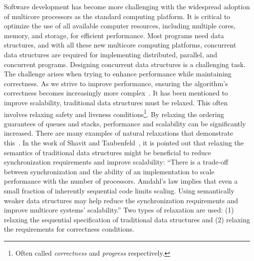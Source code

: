 Software development has become more challenging with the widespread adoption of multicore processors as the standard computing platform. It is critical to optimize the use of all available computer resources, including multiple cores, memory, and storage, for efficient performance. Most programs need data structures, and with all these new multicore computing platforms, concurrent data structures are required for implementing distributed, parallel, and concurrent programs. Designing concurrent data structures is a challenging task. The challenge arises when trying to enhance performance while maintaining correctness. As we strive to improve performance, ensuring the algorithm's correctness becomes increasingly more complex~\cite{DBLP_journals_cacm_Shavit11}. It has been mentioned to improve scalability, traditional data structures must be relaxed. This often involves relaxing safety and liveness conditions\footnote{Often called \textit{correctness} and \textit{progress} respectively.}. By relaxing the ordering guarantees of queues and stacks, performance and scalability can be significantly increased. There are many examples of natural relaxations that demonstrate this~\cite{DBLP_journals_cacm_Shavit11}. In the work of Shavit and Taubenfeld~\cite{DBLP_journals_dc_ShavitT16}, it is pointed out that relaxing the semantics of traditional data structures might be beneficial to reduce synchronization requirements and improve scalability: ``There is a trade-off between synchronization and the ability of an implementation to scale performance with the number of processors. Amdahl’s law implies that even a small fraction of inherently sequential code limits scaling. Using semantically weaker data structures may help reduce the synchronization requirements and improve multicore systems' scalability.''
Two types of relaxation are used: (1) relaxing the sequential specification of traditional data structures and (2) relaxing the requirements for correctness conditions.

